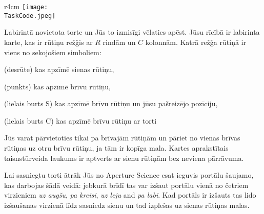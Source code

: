 \documentclass{boi2014-lv}
\renewcommand{\TaskCode}{portals}
\newcommand{\constant}[1]{{\tt #1}}
\begin{document}
    \begin{wrapfigure}[4]{r}{4cm}
        \vspace{-24pt}
		\texttt{[image: \\TaskCode.jpeg]}
	\end{wrapfigure}

		Labirintā novietota torte un Jūs to izmisīgi vēlaties apēst. Jūsu rīcībā ir labirinta karte, kas ir rūtiņu rež\v{g}is ar $R$ rindām un $C$ kolonnām. Katrā rež\v{g}a rūtiņā ir viens no sekojošiem simboliem:
    \begin{description}[itemindent=1pt]
    	\item[\constant{\#}] (desrūte) kas apzīmē sienas rūtiņu, %
        \item[\constant{.}] (punkts) kas apzīmē brīvu rūtiņu,%
        \item[\constant{S}] (lielais burts S) kas apzīmē brīvu rūtiņu un jūsu pašreizējo pozīciju,%
        \item[\constant{C}] (lielais burts C) kas apzīmē brīvu rūtiņu ar torti%
    \end{description}

		Jūs varat pārvietoties tikai pa brīvajām rūtiņām un pāriet no vienas brīvas rūtiņas uz otru brīvu rūtiņu, ja tām ir kopīga mala. Kartes aprakstītais taisnstūrveida laukums ir aptverts ar sienu rūtiņām bez neviena pārrāvuma.

		Lai sasniegtu torti ātrāk Jūs no Aperture Science\texttrademark{} esat ieguvis portālu šaujamo, kas darbojas šādā veidā: jebkurā brīdī tas var izšaut portālu vienā no četriem virzieniem \emph{uz augšu}, \emph{pa kreisi}, \emph{uz leju} and \emph{pa labi}. Kad portāls ir izšauts tas lido izšaušanas virzienā līdz sasniedz sienu un tad izplešas uz sienas rūtiņas malas. 
\end{document}
